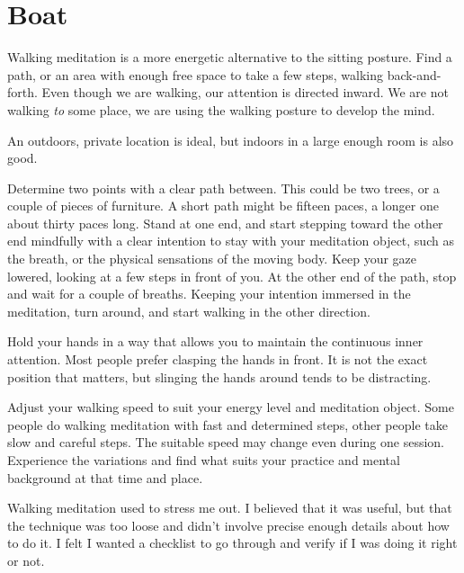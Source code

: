 \chapter{Boat}


\noindent Walking meditation is a more energetic alternative to the
sitting posture. Find a path, or an area with enough free space to take
a few steps, walking back-and-forth. Even though we are walking, our
attention is directed inward. We are not walking \emph{to} some place,
we are using the walking posture to develop the mind.

An outdoors, private location is ideal, but indoors in a large enough
room is also good.

Determine two points with a clear path between. This could be two trees,
or a couple of pieces of furniture. A short path might be fifteen paces,
a longer one about thirty paces long. Stand at one end, and start
stepping toward the other end mindfully with a clear intention to stay
with your meditation object, such as the breath, or the physical
sensations of the moving body. Keep your gaze lowered, looking at a few
steps in front of you. At the other end of the path, stop and wait for a
couple of breaths. Keeping your intention immersed in the meditation,
turn around, and start walking in the other direction.

Hold your hands in a way that allows you to maintain the continuous
inner attention. Most people prefer clasping the hands in front. It is
not the exact position that matters, but slinging the hands around tends
to be distracting.

\clearpage
\thispagestyle{empty}\mbox{}
\clearpage

Adjust your walking speed to suit your energy level and meditation
object. Some people do walking meditation with fast and determined
steps, other people take slow and careful steps. The suitable speed may
change even during one session. Experience the variations and find what
suits your practice and mental background at that time and place.


Walking meditation used to stress me out. I believed that it was useful,
but that the technique was too loose and didn't involve precise enough
details about how to do it. I felt I wanted a checklist to go through
and verify if I was doing it right or not.


